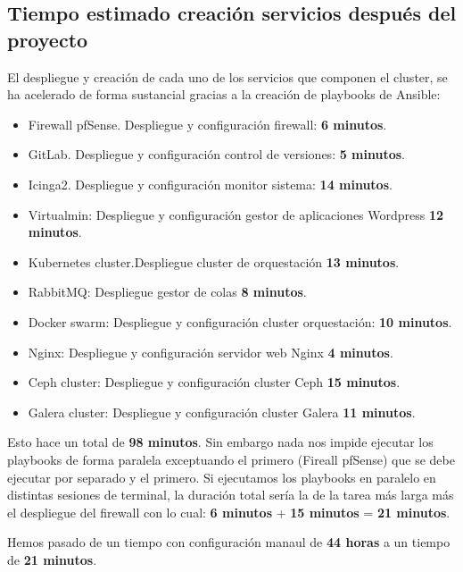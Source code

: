 \subsection{Tiempo estimado creación servicios después del proyecto}
\begin{text}
        El despliegue y creación de cada uno de los servicios que componen el cluster, se ha acelerado de forma sustancial gracias a la creación de playbooks de Ansible:
        \begin{itemize}
                \item Firewall pfSense. Despliegue y configuración firewall: \textbf{6 minutos}.
                \item GitLab. Despliegue y configuración control de versiones: \textbf{5 minutos}.
                \item Icinga2. Despliegue y configuración monitor sistema: \textbf{14 minutos}.
                \item Virtualmin: Despliegue y configuración gestor de aplicaciones Wordpress \textbf{12 minutos}.
                \item Kubernetes cluster.Despliegue cluster de orquestación \textbf{13 minutos}.
                \item RabbitMQ: Despliegue gestor de colas \textbf{8 minutos}.
                \item Docker swarm: Despliegue y configuración cluster orquestación: \textbf{10 minutos}.
                \item Nginx: Despliegue y configuración servidor web Nginx \textbf{4 minutos}.
                \item Ceph cluster: Despliegue y configuración cluster Ceph \textbf{15 minutos}.
                \item Galera cluster: Despliegue y configuración cluster Galera \textbf{11 minutos}.
        \end{itemize}

        Esto hace un total de \textbf{98 minutos}. Sin embargo nada nos impide ejecutar los playbooks de forma paralela exceptuando el primero (Fireall pfSense) que se debe ejecutar por separado y el primero. Si ejecutamos los playbooks en paralelo en distintas sesiones de terminal, la duración total sería la de la tarea más larga más el despliegue del firewall con lo cual: \textbf{6 minutos} + \textbf{15 minutos} = \textbf{21 minutos}.

        Hemos pasado de un tiempo con configuración manaul de \textbf{44 horas} a un tiempo de \textbf{21 minutos}.
\end{text}

